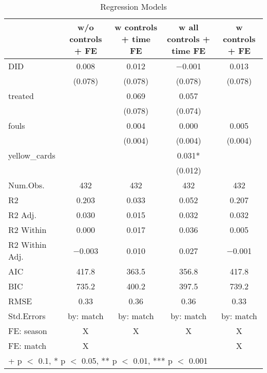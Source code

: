 \begin{table}

\caption{Regression Models}
\centering
\begin{tabular}[t]{lcccc}
\toprule
  & w/o controls + FE & w controls + time FE & w all controls + time FE & w controls + FE\\
\midrule
DID & \num{0.008} & \num{0.012} & \num{-0.001} & \num{0.013}\\
 & (\num{0.078}) & (\num{0.078}) & (\num{0.078}) & (\num{0.078})\\
treated &  & \num{0.069} & \num{0.057} & \\
 &  & (\num{0.078}) & (\num{0.074}) & \\
fouls &  & \num{0.004} & \num{0.000} & \num{0.005}\\
 &  & (\num{0.004}) & (\num{0.004}) & (\num{0.004})\\
yellow\_cards &  &  & \num{0.031}* & \\
 &  &  & (\num{0.012}) & \\
\midrule
Num.Obs. & \num{432} & \num{432} & \num{432} & \num{432}\\
R2 & \num{0.203} & \num{0.033} & \num{0.052} & \num{0.207}\\
R2 Adj. & \num{0.030} & \num{0.015} & \num{0.032} & \num{0.032}\\
R2 Within & \num{0.000} & \num{0.017} & \num{0.036} & \num{0.005}\\
R2 Within Adj. & \num{-0.003} & \num{0.010} & \num{0.027} & \num{-0.001}\\
AIC & \num{417.8} & \num{363.5} & \num{356.8} & \num{417.8}\\
BIC & \num{735.2} & \num{400.2} & \num{397.5} & \num{739.2}\\
RMSE & \num{0.33} & \num{0.36} & \num{0.36} & \num{0.33}\\
Std.Errors & by: match & by: match & by: match & by: match\\
FE: season & X & X & X & X\\
FE: match & X &  &  & X\\
\bottomrule
\multicolumn{5}{l}{\rule{0pt}{1em}+ p $<$ 0.1, * p $<$ 0.05, ** p $<$ 0.01, *** p $<$ 0.001}\\
\end{tabular}
\end{table}
